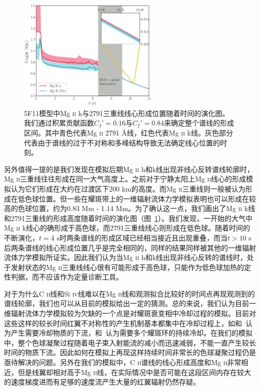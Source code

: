 \begin{figure}
	\centering
	\includegraphics[width=0.6\textwidth]{figs/formation_height}
	\caption{5F11模型中Mg \textsc{ii} k与2791三重线线心形成位置随着时间的演化图。我们通过积累贡献函数$C_I'=0.16$与$C_I'=0.84$来确定整个谱线的形成区间。其中青色代表Mg \textsc{ii} 2791 \mbox{\AA}线，红色代表Mg \textsc{ii} k线。灰色部分代表由于谱线的过于不对称和多峰结构导致无法确定线心位置的时刻。}
	\label{fig:3.16}
\end{figure}
另外值得一提的是我们发现在模拟后期Mg \textsc{ii} h和k线出现非线心反转谱线轮廓时，Mg \textsc{ii}三重线往往形成在同一大气高度上。之前对于宁静太阳上Mg \textsc{ii}线心的形成模拟认为它们形成在大约在过渡区下200 km\parencites{Leenaarts2013b}的高度。而Mg \textsc{ii}三重线则一般被认为形成在低色球位置\parencites{Pereira2015}。但一些在耀斑带上的一维辐射流体力学模拟表明也可以形成在较高的色球位置，约为0.83 Mm - 1.14 Mm\parencites{Rubio2017}。为了确认这一点，我们画出了Mg \textsc{ii} k线和2791三重线的形成高度随着时间的演化图（图~\ref{fig:3.16}）。我们发现，一开始的大气中Mg \textsc{ii} k线心的确形成于高色球，而2791三重线线心则形成在低色球。随着时间的不断演化，$t=4$ s时两条谱线的形成区域已经相当接近且出现重叠，而当$t>10$ s后两条谱线的线心形成位置几乎是完全相同的，同样的结果同样被其他的一维辐射流体力学模拟所证实\parencites{Kerr2019}。因此我们认为当Mg \textsc{ii} h和k线出现非线心反转的谱线时，处于发射状态的Mg \textsc{ii}三重线线心很有可能形成于高色球，只能作为低色球加热的定性判据，而不应该作为定量诊断工具。

对于为什么C \textsc{ii}线和Si \textsc{iv}线难以在Mg \textsc{ii}线和观测拟合比较好的时间点再现观测到的谱线轮廓，我们也可以从目前的模拟给出一定的猜测。总的来说，我们认为目前一维辐射流体力学模拟较为欠缺的一个点是对耀斑衰变相中冷却过程的模拟。目前对这些这样的较长时间红翼不对称性的产生机制基本都集中在冷却过程上，如\textcites{Tian2015}和~\textcites{Brannon2016}认为产生需要冷却物质的下流，\textcites{Reep2016}和~\textcites{Warren2016}认为需要多个耀斑环的持续冷却。在我们的模拟中，整个色球凝聚过程随着电子束入射能流的减小而迅速减弱，不能一直产生较长时间的物质下流。因此如何在模拟上再现这样持续时间非常长的色球凝聚过程仍是亟待解决的问题。另外在我们的模拟中，C \textsc{ii}谱线的线心形成高度和Mg \textsc{ii}非常相近，但是线翼却相对高于Mg \textsc{ii}线，在实际情况中是否可能在这段区间内存在较大的速度梯度进而有足够的速度流产生大量的红翼辐射仍然存疑。

